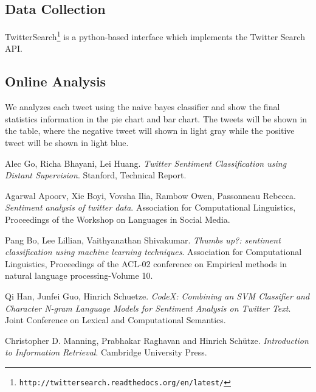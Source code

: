 \documentclass{article}
\begin{document}
\subsection{Data Collection}
TwitterSearch\footnote{\texttt{\scriptsize{http://twittersearch.readthedocs.org/en/latest/‎‎}}} is a python-based interface which implements the Twitter Search API. 
\subsection{Online Analysis}
We analyzes each tweet using the naive bayes classifier and show the final statistics information in the pie chart and bar chart. The tweets will be shown in the table, where the negative tweet will shown in light gray while the positive tweet will be shown in light blue.

\begin{thebibliography}{9}
  Alec Go, Richa Bhayani, Lei Huang.
  \emph{Twitter Sentiment Classification using Distant Supervision}.
  Stanford,
  Technical Report.

  Agarwal Apoorv, Xie Boyi, Vovsha Ilia, Rambow Owen, Passonneau Rebecca.
  \emph{Sentiment analysis of twitter data}.
  Association for Computational Linguistics,
  Proceedings of the Workshop on Languages in Social Media.

  Pang Bo, Lee Lillian, Vaithyanathan Shivakumar.
  \emph{Thumbs up?: sentiment classification using machine learning techniques}.
  Association for Computational Linguistics,
  Proceedings of the ACL-02 conference on Empirical methods in natural language processing-Volume 10.

  Qi Han, Junfei Guo, Hinrich Schuetze.
  \emph{CodeX: Combining an SVM Classifier and Character N-gram Language Models for Sentiment Analysis on Twitter Text}.
  Joint Conference on Lexical and Computational Semantics.

  Christopher D. Manning, Prabhakar Raghavan and Hinrich Schütze.
  \emph{Introduction to Information Retrieval}.
  Cambridge University Press.

\end{thebibliography}
\end{document}
